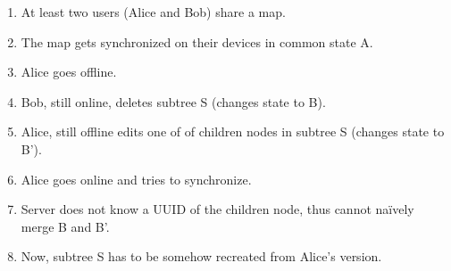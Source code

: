 \begin{enumerate}
	\item At least two users (Alice and Bob) share a map.
	\item The map gets synchronized on their devices in common state A.
	\item Alice goes offline.
	\item Bob, still online, deletes subtree S (changes state to B).
	\item Alice, still offline edits one of of children nodes in subtree S (changes state to B').
	\item Alice goes online and tries to synchronize.
	\item Server does not know a UUID of the children node, thus cannot naïvely merge B and B'.
	\item Now, subtree S has to be somehow recreated from Alice's version.
\end{enumerate}

